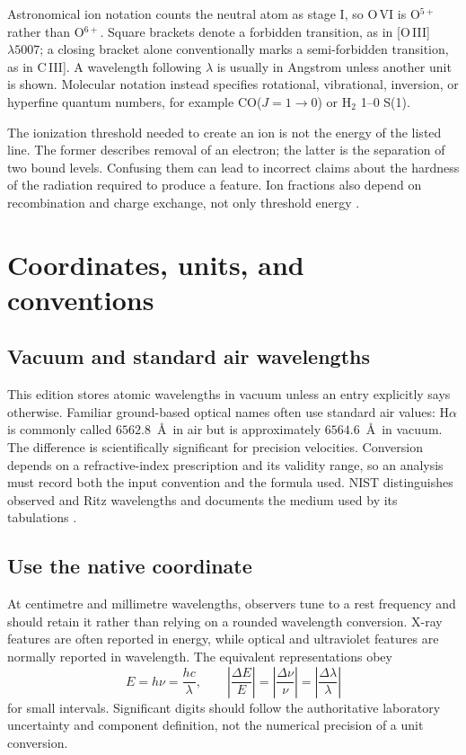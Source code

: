 Astronomical ion notation counts the neutral atom as stage I, so O\,VI is
O$^{5+}$ rather than O$^{6+}$.  Square brackets denote a forbidden transition,
as in [O\,III] $\lambda5007$; a closing bracket alone conventionally marks a
semi-forbidden transition, as in C\,III].  A wavelength following $\lambda$ is
usually in Angstrom unless another unit is shown.  Molecular notation instead
specifies rotational, vibrational, inversion, or hyperfine quantum numbers, for
example CO($J=1\!\rightarrow\!0$) or H$_2$ 1--0 S(1).

The ionization threshold needed to create an ion is not the energy of the listed
line.  The former describes removal of an electron; the latter is the separation
of two bound levels.  Confusing them can lead to incorrect claims about the
hardness of the radiation required to produce a feature.  Ion fractions also
depend on recombination and charge exchange, not only threshold energy
\citep{OsterbrockFerland2006,Draine2011}.

\section{Coordinates, units, and conventions}

\subsection{Vacuum and standard air wavelengths}

This edition stores atomic wavelengths in vacuum unless an entry explicitly says
otherwise.  Familiar ground-based optical names often use standard air values:
H$\alpha$ is commonly called $6562.8$~\AA\ in air but is approximately
$6564.6$~\AA\ in vacuum.  The difference is scientifically significant for
precision velocities.  Conversion depends on a refractive-index prescription and
its validity range, so an analysis must record both the input convention and the
formula used.  NIST distinguishes observed and Ritz wavelengths and documents
the medium used by its tabulations \citep{nist-asd}.

\subsection{Use the native coordinate}

At centimetre and millimetre wavelengths, observers tune to a rest frequency and
should retain it rather than relying on a rounded wavelength conversion.  X-ray
features are often reported in energy, while optical and ultraviolet features are
normally reported in wavelength.  The equivalent representations obey
\begin{equation}
  E = h\nu = \frac{hc}{\lambda},
  \qquad
  \left|\frac{\Delta E}{E}\right|
  =\left|\frac{\Delta\nu}{\nu}\right|
  =\left|\frac{\Delta\lambda}{\lambda}\right|
\end{equation}
for small intervals.  Significant digits should follow the authoritative
laboratory uncertainty and component definition, not the numerical precision of
a unit conversion.

